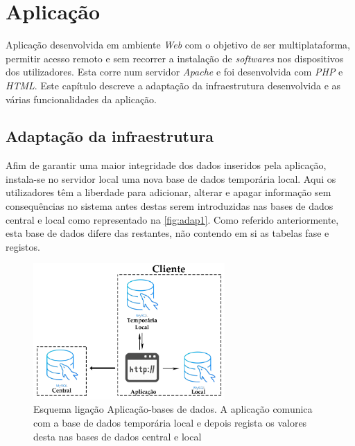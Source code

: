 \documentclass[11pt,twoside,a4paper]{report}
\begin{document}
\cleardoublepage
\chapter{Aplicação}
Aplicação desenvolvida em ambiente  \textit{Web} com o objetivo de ser multiplataforma, permitir acesso remoto e sem recorrer a instalação de \textit{softwares} nos dispositivos dos utilizadores. Esta corre num servidor \textit{Apache} e foi desenvolvida com \textit{PHP} e \textit{HTML}. Este capítulo descreve a adaptação da infraestrutura desenvolvida e as várias funcionalidades da aplicação.

\section{Adaptação da infraestrutura}
Afim de garantir uma maior integridade dos dados inseridos pela aplicação, instala-se no servidor local uma nova base de dados temporária local. Aqui os utilizadores têm a liberdade para adicionar, alterar e apagar informação sem consequências no sistema antes destas serem introduzidas nas bases de dados central e local como representado na \autoref{fig:adap1}. Como referido anteriormente, esta base de dados difere das restantes, não contendo em si as tabelas fase e registos.
\begin{figure}[H]
	\begin{center}
		\includegraphics[width=0.65\textwidth]{Aplicacao_temp_local_central} %
		\caption{Esquema ligação Aplicação-bases de dados. A aplicação comunica com a base de dados temporária local e depois regista os valores desta nas bases de dados central e local}
		\label{fig:adap1}
	\end{center}
\end{figure}
\end{document}

